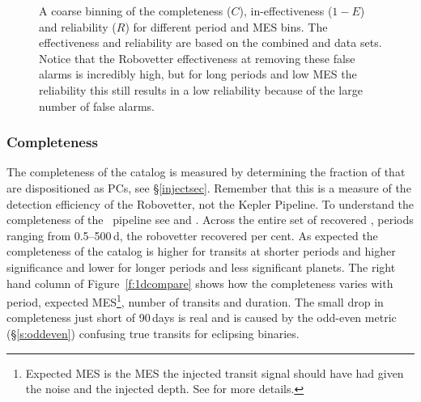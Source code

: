 \begin{figure}[h!]
\begin{center}
\caption{ A coarse binning of the completeness ($C$), in-effectiveness ($1-E$) and reliability ($R$) for different period and MES bins. The effectiveness and reliability are based on the combined \invtce{} and \scrtce{} data sets. Notice that the Robovetter effectiveness at removing these false alarms is incredibly high, but for long periods and low MES the reliability this still results in a low reliability because of the large number of false alarms. }
\label{f:scoregrid}
\end{center}
\end{figure}



\subsubsection{Completeness}
The completeness of the catalog is measured by determining the fraction of  that are dispositioned as PCs, see \S\ref{injectsec}. Remember that this is a measure of the detection efficiency of the Robovetter, not the Kepler Pipeline.  To understand the completeness of the \Kepler\ pipeline see \citet{Christiansen2017} and \citet{Burke2017b}. 
Across the entire set of recovered , periods ranging from 0.5--500\,d, the robovetter recovered \completeness{} per cent. As expected the completeness of the catalog is higher for transits at shorter periods and higher significance and lower for longer periods and less significant planets. The right hand column of Figure~\ref{f:1dcompare} shows how the completeness varies with period, expected MES\footnote{Expected MES is the MES the injected transit signal should have had given the noise and the injected depth. See \citet{Christiansen2017} for more details.}, number of transits and duration. The small drop in completeness just short of 90\,days is real and is caused by the odd-even metric (\S\ref{s:oddeven}) confusing true transits for eclipsing binaries.  

